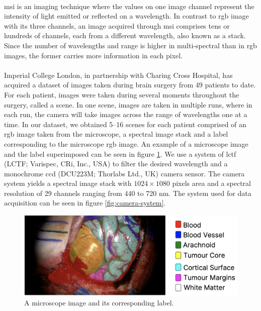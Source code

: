 \documentclass[12pt,oneside]{report}
\begin{document}
\paragraph{}
\acrfull{msi} is an imaging technique where the values on one image channel represent the intensity of light emitted or reflected on a wavelength. In contrast to \acrshort{rgb} image with its three channels, an image acquired through \acrshort{msi} comprises tens or hundreds of channels, each from a different wavelength, also known as a stack. Since the number of wavelengths and range is higher in multi-spectral than in \acrshort{rgb} images, the former carries more information in each pixel.

\paragraph{}
Imperial College London, in partnership with Charing Cross Hospital, has acquired a dataset of images taken during brain surgery from 49 patients to date. For each patient, images were taken during several moments throughout the surgery, called a scene. In one scene, images are taken in multiple runs, where in each run, the camera will take images across the range of wavelengths one at a time. In our dataset, we obtained 5--16 scenes for each patient comprised of an \acrshort{rgb} image taken from the microscope, a spectral image stack and a label corresponding to the microscope \acrshort{rgb} image. An example of a microscope image and the label superimposed can be seen in figure \ref{fig:label}. We use a system of \acrlong{lctf} (LCTF; Varispec, CRi, Inc., USA) to filter the desired wavelength and a monochrome \acrlong{ccd} (DCU223M; Thorlabs Ltd., UK) camera sensor. The camera system yields a spectral image stack with $1024 \times 1080$ pixels area and a spectral resolution of 29 channels ranging from 440 to 720 nm. The system used for data acquisition can be seen in figure \ref{fig:camera-system}.

\begin{figure}[h]
\centering
\begin{minipage}[h]{0.7\textwidth}
    \centering
    \includegraphics[width=\textwidth]{figures/label.png}
    \caption{A microscope image and its corresponding label.}
    \label{fig:label}
\end{minipage}
\end{figure}
\end{document}
